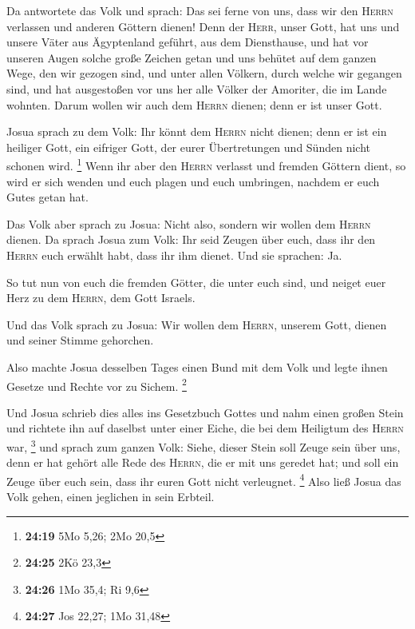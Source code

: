  Da antwortete das Volk und sprach: Das sei ferne von
uns, dass wir den \textsc{Herrn} verlassen und anderen Göttern dienen!
 Denn der \textsc{Herr}, unser Gott, hat uns und unsere
Väter aus Ägyptenland geführt, aus dem Diensthause, und hat vor unseren
Augen solche große Zeichen getan und uns behütet auf dem ganzen Wege,
den wir gezogen sind, und unter allen Völkern, durch welche wir gegangen
sind,  und hat ausgestoßen vor uns her alle Völker der
Amoriter, die im Lande wohnten. Darum wollen wir auch dem \textsc{Herrn}
dienen; denn er ist unser Gott.

 Josua sprach zu dem Volk: Ihr könnt dem \textsc{Herrn}
nicht dienen; denn er ist ein heiliger Gott, ein eifriger Gott, der
eurer Übertretungen und Sünden nicht schonen wird. \footnote{\textbf{24:19}
  5Mo 5,26; 2Mo 20,5}  Wenn ihr aber den \textsc{Herrn}
verlasst und fremden Göttern dient, so wird er sich wenden und euch
plagen und euch umbringen, nachdem er euch Gutes getan hat.

 Das Volk aber sprach zu Josua: Nicht also, sondern wir
wollen dem \textsc{Herrn} dienen.  Da sprach Josua zum
Volk: Ihr seid Zeugen über euch, dass ihr den \textsc{Herrn} euch
erwählt habt, dass ihr ihm dienet. Und sie sprachen: Ja.

 So tut nun von euch die fremden Götter, die unter euch
sind, und neiget euer Herz zu dem \textsc{Herrn}, dem Gott Israels.

 Und das Volk sprach zu Josua: Wir wollen dem
\textsc{Herrn}, unserem Gott, dienen und seiner Stimme gehorchen.

 Also machte Josua desselben Tages einen Bund mit dem
Volk und legte ihnen Gesetze und Rechte vor zu Sichem. \footnote{\textbf{24:25}
  2Kö 23,3}

 Und Josua schrieb dies alles ins Gesetzbuch Gottes und
nahm einen großen Stein und richtete ihn auf daselbst unter einer Eiche,
die bei dem Heiligtum des \textsc{Herrn} war, \footnote{\textbf{24:26}
  1Mo 35,4; Ri 9,6}  und sprach zum ganzen Volk: Siehe,
dieser Stein soll Zeuge sein über uns, denn er hat gehört alle Rede des
\textsc{Herrn}, die er mit uns geredet hat; und soll ein Zeuge über euch
sein, dass ihr euren Gott nicht verleugnet. \footnote{\textbf{24:27} Jos
  22,27; 1Mo 31,48}  Also ließ Josua das Volk gehen,
einen jeglichen in sein Erbteil.

